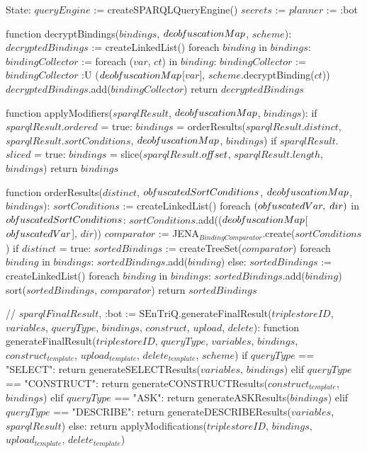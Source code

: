 State:
    $queryEngine$ := createSPARQLQueryEngine()
    $secrets$ := {}
    $planner$ := :bot

function decryptBindings($bindings$, $deob\textrm{\emph{f}}uscationMap$, $scheme$):
    $decryptedBindings$ := createLinkedList()
    foreach $binding$ in $bindings$:
        $bindingCollector$ := {}
        foreach ($var$, $ct$) in $binding$:
            $bindingCollector$ := $bindingCollector$ :U { ($deob\textrm{\emph{f}}uscationMap$[$var$], $scheme$.decryptBinding($ct$)) }
        $decryptedBindings$.add($bindingCollector$)
    return $decryptedBindings$

function applyModifiers($sparqlResult$, $deob\textrm{\emph{f}}uscationMap$, $bindings$):
    if $sparqlResult$.$ordered$ = true:
        $bindings$ = orderResults($sparqlResult$.$distinct$, $sparqlResult$.$sortConditions$, $deob\textrm{\emph{f}}uscationMap$, $bindings$)
    if $sparqlResult$.$sliced$ = true:
        $bindings$ = slice($sparqlResult$.$o\textrm{\emph{ff}}set$, $sparqlResult$.$length$, $bindings$)
    return $bindings$

function orderResults($distinct$, $ob\textrm{\emph{f}}uscatedSortConditions$, $deob\textrm{\emph{f}}uscationMap$, $bindings$):
    $sortConditions$ := createLinkedList()
    foreach $(ob\textrm{\emph{f}}uscatedVar, \; dir)$ in $ob\textrm{\emph{f}}uscatedSortConditions$:
        $sortConditions$.add(($deob\textrm{\emph{f}}uscationMap$[$ob\textrm{\emph{f}}uscatedVar$], $dir$))
    $comparator$ := JENA$_{BindingComparator}$.create($sortConditions$)
    if $distinct$ = true:
        $sortedBindings$ := createTreeSet($comparator$)
        foreach $binding$ in $bindings$:
            $sortedBindings$.add($binding$)
    else:
        $sortedBindings$ := createLinkedList()
        foreach $binding$ in $bindings$:
            $sortedBindings$.add($binding$)
        sort($sortedBindings$, $comparator$)
    return $sortedBindings$

// {$sparqlFinalResult$, :bot} := $\textrm{SEnTriQ}$.generateFinalResult($triplestoreID$, $variables$, $queryType$, $bindings$, $construct$, $upload$, $delete$):
function generateFinalResult($triplestoreID$, $queryType$, $variables$, $bindings$, $construct_{template}$, $upload_{template}$, $delete_{template}$, $scheme$)
    if $queryType$ == "SELECT":
        return generateSELECTResults($variables$, $bindings$)
    elif $queryType$ == "CONSTRUCT":
        return generateCONSTRUCTResults($construct_{template}$, $bindings$)
    elif $queryType$ == "ASK":
        return generateASKResults($bindings$)
    elif $queryType$ == "DESCRIBE":
        return generateDESCRIBEResults($variables$, $sparqlResult$)
    else:
        return applyModifications($triplestoreID$, $bindings$, $upload_{template}$, $delete_{template}$)   

